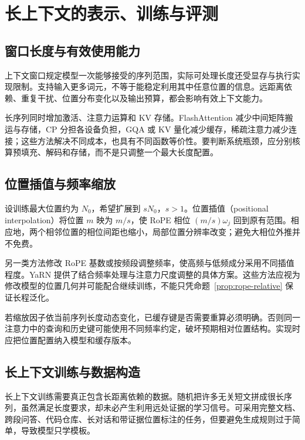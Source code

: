 \setcounter{chapter}{25} %
\chapter{长上下文的表示、训练与评测}
\label{ch:longcontext}

\section{窗口长度与有效使用能力}

上下文窗口规定模型一次能够接受的序列范围，实际可处理长度还受显存与执行实现限制。支持输入更多词元，不等于能稳定利用其中任意位置的信息。远距离依赖、重复干扰、位置分布变化以及输出预算，都会影响有效上下文能力。

长序列同时增加激活、注意力运算和 KV 存储。FlashAttention 减少中间矩阵搬运与存储，CP 分担各设备负担，GQA 或 KV 量化减少缓存，稀疏注意力减少连接；这些方法解决不同成本，也具有不同函数等价性。要判断系统瓶颈，应分别核算预填充、解码和存储，而不是只调整一个最大长度配置。

\section{位置插值与频率缩放}

设训练最大位置约为 $N_0$，希望扩展到 $sN_0$，$s>1$。位置插值（positional interpolation）将位置 $m$ 映为 $m/s$，使 RoPE 相位 $(m/s)\omega_j$ 回到原有范围\cite{pi}。相应地，两个相邻位置的相位间距也缩小，局部位置分辨率改变；避免大相位外推并不免费。

另一类方法修改 RoPE 基数或按频段调整频率，使高频与低频成分采用不同插值程度。YaRN 提供了结合频率处理与注意力尺度调整的具体方案\cite{yarn}。这些方法应视为修改模型的位置几何并可能配合继续训练，不能只凭命题~\ref{prop:rope-relative} 保证长程泛化。

若缩放因子依当前序列长度动态变化，已缓存键是否需要重算必须明确。否则同一注意力中的查询和历史键可能使用不同频率约定，破坏预期相对位置结构。实现时应把位置配置纳入模型和缓存版本。

\section{长上下文训练与数据构造}

长上下文训练需要真正包含长距离依赖的数据。随机把许多无关短文拼成很长序列，虽然满足长度要求，却未必产生利用远处证据的学习信号。可采用完整文档、跨段问答、代码仓库、长对话和带证据位置标注的任务，但要避免生成规则过于简单，导致模型只学模板。

